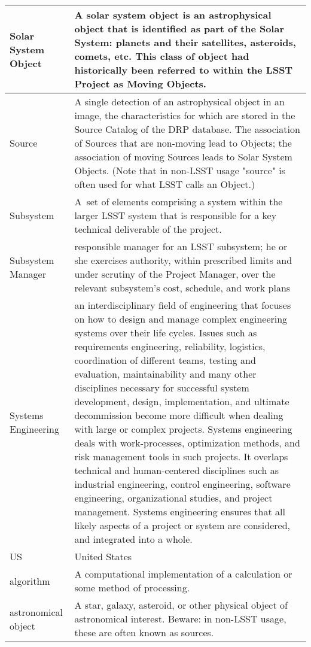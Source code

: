 \begin{longtable}{|l|p{}|}
Solar System \gls{Object} & A solar system object is an astrophysical object that is identified as part of the Solar System: planets and their satellites, asteroids, comets, etc. This class of object had historically been referred to within the \gls{LSST} Project as Moving Objects. \\\hline
Source & A single detection of an astrophysical object in an image, the characteristics for which are stored in the \gls{Source} Catalog of the \gls{DRP} database. The association of Sources that are non-moving lead to Objects; the association of moving Sources leads to Solar System Objects. (Note that in non-LSST usage "source" is often used for what \gls{LSST} calls an \gls{Object}.) \\\hline
Subsystem & A set of elements comprising a system within the larger \gls{LSST} system that is responsible for a key technical deliverable of the project. \\\hline
Subsystem Manager & responsible manager for an LSST subsystem; he or she exercises authority, within prescribed limits and under scrutiny of the Project Manager, over the relevant subsystem's cost, schedule, and work plans \\\hline
Systems Engineering & an interdisciplinary field of engineering that focuses on how to design and manage complex engineering systems over their life cycles. Issues such as requirements engineering, reliability, logistics, coordination of different teams, testing and evaluation, maintainability and many other disciplines necessary for successful system development, design, implementation, and ultimate decommission become more difficult when dealing with large or complex projects. Systems engineering deals with work-processes, optimization methods, and risk management tools in such projects. It overlaps technical and human-centered disciplines such as industrial engineering, control engineering, software engineering, organizational studies, and project management. Systems engineering ensures that all likely aspects of a project or system are considered, and integrated into a whole. \\\hline
US & United States \\\hline
algorithm & A computational implementation of a calculation or some method of processing. \\\hline
astronomical object & A star, galaxy, asteroid, or other physical object of astronomical interest. Beware: in non-LSST usage, these are often known as sources. \\\hline

\end{longtable}
